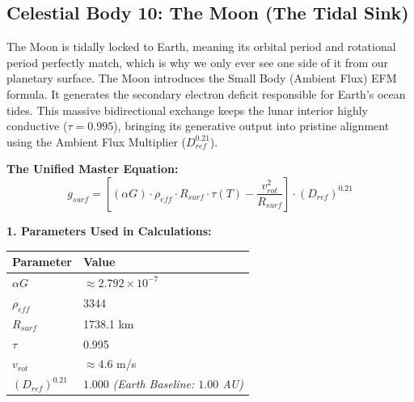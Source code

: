 \documentclass[11pt, a4paper]{article}
\begin{document}
\clearpage
\subsection{Celestial Body 10: The Moon (The Tidal Sink)}
  The Moon is tidally locked to Earth, meaning its orbital period and rotational period perfectly match, which is why we only ever see one side of it from our planetary surface. The Moon introduces the Small Body (Ambient Flux) EFM formula. It generates the secondary electron deficit responsible for Earth's ocean tides. This massive bidirectional exchange keeps the lunar interior highly conductive ($\tau = 0.995$), bringing its generative output into pristine alignment using the Ambient Flux Multiplier ($D_{ref}^{0.21}$).

  \vspace{0.5em}
  \noindent \textbf{The Unified Master Equation:}
  $$ g_{surf} = \left[ (\alpha G) \cdot \rho_{eff} \cdot R_{surf} \cdot \tau(T) - \frac{v_{rot}^2}{R_{surf}} \right] \cdot (D_{ref})^{0.21} $$

  \vspace{0.5em}
  \noindent \textbf{1. Parameters Used in Calculations:} \\[0.5em]
  \begingroup
  \renewcommand{\arraystretch}{1.3}
  \hspace*{2em}
  \begin{tabular}{|l|l|}
    \hline
    \textbf{Parameter} & \textbf{Value} \\ \hline
    $\alpha G$ & $\approx 2.792 \times 10^{-7}$ \\ \hline
    $\rho_{eff}$ & 3344 \\ \hline
    $R_{surf}$ & 1738.1 km \\ \hline
    $\tau$ & 0.995 \\ \hline
    $v_{rot}$ & $\approx 4.6$ m/s \\ \hline
    $(D_{ref})^{0.21}$ & $1.000$ \textit{(Earth Baseline: $1.00$ AU)} \\ \hline
  \end{tabular}
  \endgroup
\end{document}
